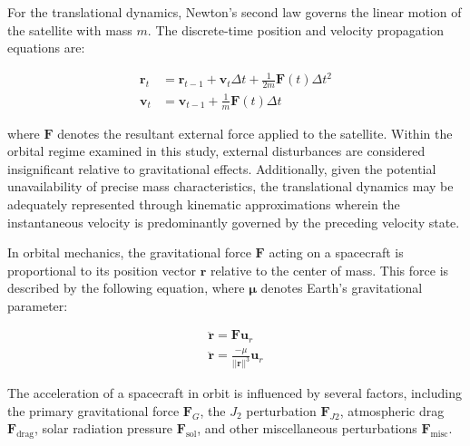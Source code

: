 
\label{sec:dynamics}


For the translational dynamics, Newton's second law governs the linear motion of the satellite with mass $m$. The discrete-time position and velocity propagation equations are:

\begin{align}
\mathbf{r}_t &= \mathbf{r}_{t-1} + \mathbf{v}_t\Delta t + \frac{1}{2m}\mathbf{F}(t)\Delta t^2 \\
\mathbf{v}_t &= \mathbf{v}_{t-1} + \frac{1}{m}\mathbf{F}(t)\Delta t
\end{align}

\noindent where $\mathbf{F}$ denotes the resultant external force applied to the satellite. 
Within the orbital regime examined in this study, external disturbances are considered insignificant relative to 
gravitational effects. Additionally, given the potential unavailability of precise mass characteristics, the translational dynamics 
may be adequately represented through kinematic approximations wherein the instantaneous velocity is predominantly governed by the preceding velocity state.
\vspace{0.5cm}

\noindent In orbital mechanics, the gravitational force $\mathbf{F}$ acting on a spacecraft is 
proportional to its position vector $\mathbf{r}$ relative to the center of mass. This force is described by the following equation, 
where $\boldsymbol{\mu}$ denotes Earth’s gravitational parameter:


\begin{align}
    \ddot{\mathbf{r}} = \mathbf{F}\mathbf{u}_r \\
    \ddot{\mathbf{r}} = \frac{-\mu}{||\mathbf{r}||^3}\mathbf{u}_r
\end{align}


\noindent The acceleration of a spacecraft in orbit is influenced by several factors, including the primary gravitational 
force $\mathbf{F}_G$, the $J_2$ perturbation $\mathbf{F}_{J2}$, atmospheric drag $\mathbf{F}_{\text{drag}}$, solar radiation 
pressure $\mathbf{F}_{\text{sol}}$, and other miscellaneous perturbations $\mathbf{F}_{\text{misc}}$.
\vspace{0.5cm}

